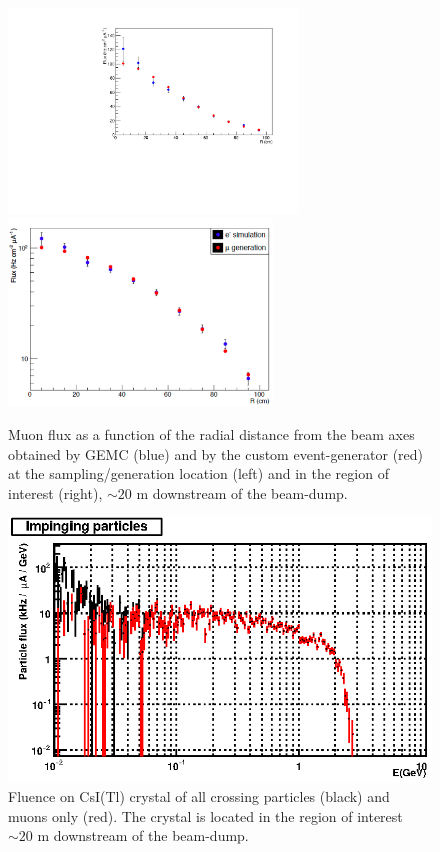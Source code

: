 \begin{figure}[h!] 
\center
\includegraphics[width=7.7cm]{figs/SimVSGen.pdf}
\includegraphics[width=7.0cm]{figs/mu-comp-far.pdf}
\caption{Muon flux as a function of the radial  distance from the beam axes obtained by GEMC (blue) and by the custom event-generator (red) at the sampling/generation location (left) and in the region of interest (right), $\sim 20$ m downstream of the beam-dump.}
\label{fig:mu-sampling-extract} 
\end{figure}


\begin{figure}[h!] 
\center
\includegraphics[width=15cm]{figs/fig19_crsA.eps}    
\caption{Fluence  on  CsI(Tl) crystal of  all crossing particles (black) and muons only (red). The crystal is located in the region of interest $\sim 20$ m downstream of the beam-dump. }
\label{fig:bg-csi}
\end{figure}


